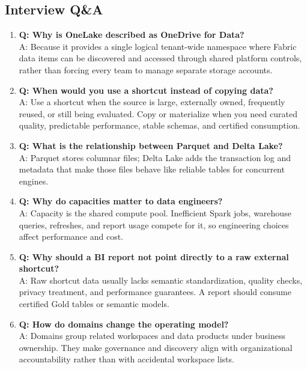 \subsection{Interview Q\&A}
\begin{enumerate}
    \item \textbf{Q: Why is OneLake described as OneDrive for Data?}\\
    A: Because it provides a single logical tenant-wide namespace where Fabric data items can be discovered and accessed through shared platform controls, rather than forcing every team to manage separate storage accounts.
    \item \textbf{Q: When would you use a shortcut instead of copying data?}\\
    A: Use a shortcut when the source is large, externally owned, frequently reused, or still being evaluated. Copy or materialize when you need curated quality, predictable performance, stable schemas, and certified consumption.
    \item \textbf{Q: What is the relationship between Parquet and Delta Lake?}\\
    A: Parquet stores columnar files; Delta Lake adds the transaction log and metadata that make those files behave like reliable tables for concurrent engines.
    \item \textbf{Q: Why do capacities matter to data engineers?}\\
    A: Capacity is the shared compute pool. Inefficient Spark jobs, warehouse queries, refreshes, and report usage compete for it, so engineering choices affect performance and cost.
    \item \textbf{Q: Why should a BI report not point directly to a raw external shortcut?}\\
    A: Raw shortcut data usually lacks semantic standardization, quality checks, privacy treatment, and performance guarantees. A report should consume certified Gold tables or semantic models.
    \item \textbf{Q: How do domains change the operating model?}\\
    A: Domains group related workspaces and data products under business ownership. They make governance and discovery align with organizational accountability rather than with accidental workspace lists.
\end{enumerate}

